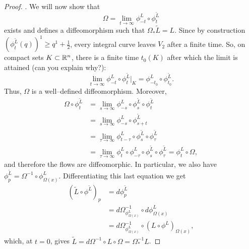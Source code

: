 \begin{proof}
	. We will now show that
	\begin{equation}
		\Omega = \lim_{t\to\infty} \phi_{-t}^L \circ \phi_t^{\widetilde{L}}
	\end{equation}
	exists and defines a diffeomorphism such that $\Omega_* \widetilde{L} = L$.
	Since by construction $(\phi_t^{\widetilde{L}}(q))^1 \geq q^1 + \frac12$, every integral curve leaves $V_2$ after a finite time.
	So, on compact sets $K\subset\mathbb{R}^n$, there is a finite time $t_0(K)$ after which the limit is attained (can you explain why?):
	\begin{equation}
		\lim_{t\to\infty} \phi_{-t}^L \circ \phi_t^{\widetilde{L}}\Big|_K = \phi_{-t_0}^L \circ \phi_{t_0}^{\widetilde{L}}.
	\end{equation}
	Thus, $\Omega$ is a well--defined diffeomorphism.
	Moreover,
	\begin{align}
		\Omega \circ \phi^{\widetilde{L}}_t & = \lim_{s\to\infty} \phi_{-s}^L \circ \phi^{\widetilde{L}}_s \circ \phi^{\widetilde{L}}_t                                                    \\
		                                    & = \lim_{s\to\infty} \phi_{-s}^L \circ \phi^{\widetilde{L}}_{s+t}                                                                             \\
		                                    & = \lim_{\tau\to\infty} \phi_{t-\tau}^L \circ \phi^{\widetilde{L}}_s \circ \phi^{\widetilde{L}}_\tau                                          \\
		                                    & = \lim_{\tau\to\infty} \phi_{t}^L \circ \phi_{-\tau}^L \circ \phi^{\widetilde{L}}_s \circ \phi^{\widetilde{L}}_\tau = \phi_t^L \circ \Omega,
	\end{align}
	and therefore the flows are diffeomorphic.
	In particular, we also have $\phi_p^{\widetilde{L}} = \Omega^{-1} \circ \phi^L_{\Omega(x)}$.
	Differentiating this last equation we get
	\begin{align}
		(\widetilde{L} \circ \phi^{\widetilde{L}})_p & = d\phi^{\widetilde{L}}_p                                               \\
		                                             & = d\Omega^{-1}_{\phi^L_{\Omega(x)}} \circ d\phi^L_{\Omega(x)}           \\
		                                             & = d\Omega^{-1}_{\phi^L_{\Omega(x)}} \circ (L \circ \phi^L)_{\Omega(x)},
	\end{align}
	which, at $t=0$, gives $\widetilde{L} = d\Omega^{-1} \circ L \circ \Omega = \Omega^{-1}_* L$.
\end{proof}


